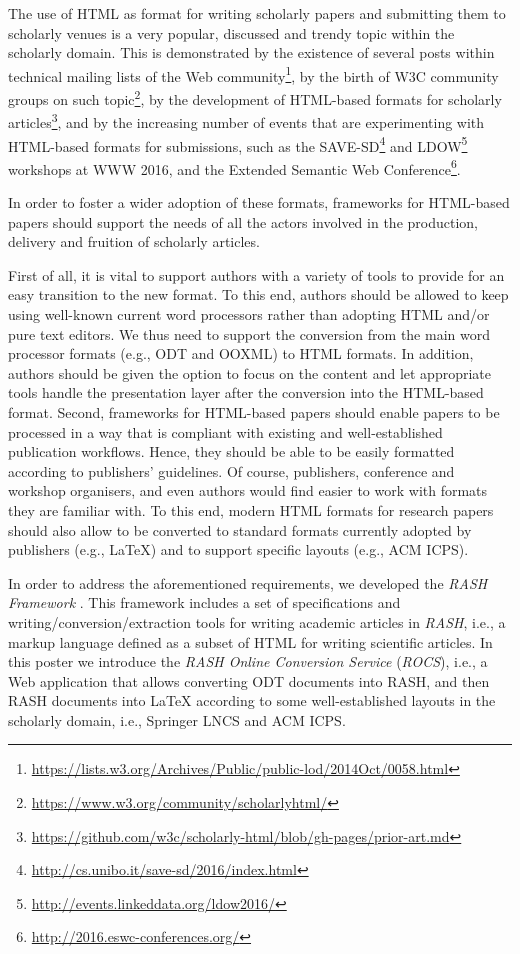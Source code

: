 \documentclass{sig-alternate}
\begin{document}
The use of HTML as format for writing scholarly papers and submitting them to scholarly venues is a very popular, discussed and trendy topic within the scholarly domain. This is demonstrated by the existence of several posts within technical mailing lists of the Web community\footnote{\url{https://lists.w3.org/Archives/Public/public-lod/2014Oct/0058.html}}, by the birth of W3C community groups on such topic\footnote{\url{https://www.w3.org/community/scholarlyhtml/}}, by the development of HTML-based formats for scholarly articles\footnote{\url{https://github.com/w3c/scholarly-html/blob/gh-pages/prior-art.md}}, and by the increasing number of events that are experimenting with HTML-based formats for submissions, such as the SAVE-SD\footnote{\url{http://cs.unibo.it/save-sd/2016/index.html}} and LDOW\footnote{\url{http://events.linkeddata.org/ldow2016/}} workshops at WWW 2016, and the Extended Semantic Web Conference\footnote{\url{http://2016.eswc-conferences.org/}}.

In order to foster a wider adoption of these formats, frameworks for HTML-based papers should support the needs of all the actors involved in the production, delivery and fruition of scholarly articles.

First of all, it is vital to support authors with a variety of tools to provide for an easy transition to the new format. To this end, authors should be allowed to keep using well-known current word processors rather than adopting HTML and/or pure text editors. We thus need to support the conversion from the main word processor formats (e.g., ODT and OOXML) to HTML formats. In addition, authors should be given the option to focus on the content and let appropriate tools handle the presentation layer after the conversion into the HTML-based format. Second, frameworks for HTML-based papers should enable papers to be processed in a way that is compliant with existing and well-established publication workflows. Hence, they should be able to be easily formatted according to publishers' guidelines. Of course, publishers, conference and workshop organisers, and even authors would find easier to work with formats they are familiar with. To this end, modern HTML formats for research papers should also allow to be converted to standard formats currently adopted by publishers (e.g., LaTeX) and to support specific layouts (e.g., ACM ICPS).

In order to address the aforementioned requirements, we developed the {\em RASH Framework} \cite{__RefNumPara__2213_824787510}. This framework includes a set of specifications and writing/conversion/extraction tools for writing academic articles in {\em RASH}, i.e., a markup language defined as a subset of HTML for writing scientific articles. In this poster we introduce the {\em RASH Online Conversion Service} ({\em ROCS}), i.e., a Web application that allows converting ODT documents into RASH, and then RASH documents into LaTeX according to some well-established layouts in the scholarly domain, i.e., Springer LNCS and ACM ICPS.
\end{document}
